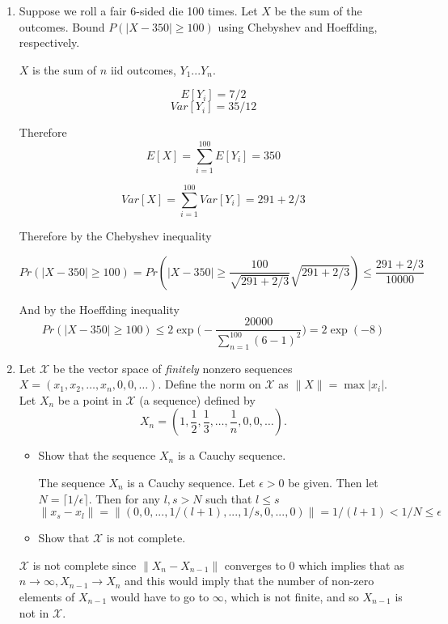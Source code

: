 \documentclass{article}
\begin{document}
\begin{enumerate}
\color{black}


\item
Suppose we roll a fair 6-sided die 100 times. Let $X$ be the sum of the outcomes.  Bound $P(|X-350| \ge 100)$ using Chebyshev and Hoeffding, respectively.

\color{blue}

$X$ is the sum of $n$ iid outcomes, $Y_1 ... Y_n$.

\[
E[Y_i] = 7/2
\]
\[
Var[Y_i] = 35/12
\]

Therefore
$$E[X] = \sum_{i=1} ^{100} E[Y_i] = 350$$

$$Var[X] = \sum_{i=1} ^{100} Var[Y_i] =  291 + 2/3$$

Therefore by the Chebyshev inequality

\[
Pr(|X-350| \geq 100) = Pr(|X-350| \geq \frac{100}{\sqrt{291+2/3}}\sqrt{291+ 2/3}) \leq \frac{291+2/3}{10000}
\]

And by the Hoeffding inequality
$$Pr(|X-350| \geq 100) \leq 2 \exp \bigg( -\frac{20000}{\sum_{n=1}^{100}(6-1)^2} \bigg) = 2 \exp (-8)$$

\color{black}

\item
Let $\mathcal X$ be the vector space of \emph{finitely} nonzero sequences $X=(x_1, x_2, \ldots, x_n, 0, 0, \ldots)$.
Define the norm on $\mathcal X$ as $\|X\|=\max |x_i|$.
Let $X_n$ be a point in $\mathcal X$ (a sequence) defined by
$$X_n = \left(1, \frac{1}{2}, \frac{1}{3}, \ldots, \frac{1}{n}, 0, 0, \ldots \right).$$

\begin{itemize}
\item
Show that the sequence $X_n$ is a Cauchy sequence.

\color{blue}
The sequence $X_n$ is a Cauchy sequence. Let $\epsilon > 0$ be given. 
Then let $N= \lceil 1/\epsilon \rceil$. Then for any $l,s > N$
such that $l \leq s$
$$
\|x_s - x_l\| = \|(0,0,...,1/(l+1), ..., 1/s,0,...,0)\| = 1/(l+1) < 1/N \leq \epsilon
$$
\color{black}

\item
Show that $\mathcal X$ is not complete.
\end{itemize}

\color{blue}

$\mathcal X$ is not complete since $\|X_n - X_{n-1}\|$ converges to 0 which implies that as $n \to \infty, X_{n-1} \to X_n$ and this would imply that the number of non-zero elements of $X_{n-1}$ would have to go to $\infty$, which is not finite, and so $X_{n-1}$ is not in $\mathcal X$. 
\color{black}




\end{enumerate}
\end{document}
